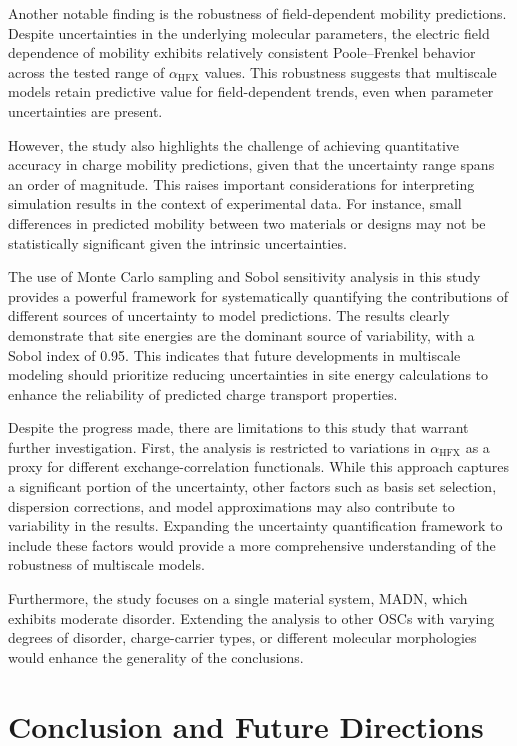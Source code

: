 \documentclass[%
 reprint,
superscriptaddress,
 amsmath,amssymb,
 aps,
prb,
floatfix
]{revtex4-2}
\newcommand{\ahfx}{\ensuremath{\alpha_\text{HFX}}\xspace}
\begin{document}
Another notable finding is the robustness of field-dependent mobility predictions. Despite uncertainties in the underlying molecular parameters, the electric field dependence of mobility exhibits relatively consistent Poole--Frenkel behavior across the tested range of \ahfx values. This robustness suggests that multiscale models retain predictive value for field-dependent trends, even when parameter uncertainties are present.  

However, the study also highlights the challenge of achieving quantitative accuracy in charge mobility predictions, given that the uncertainty range spans an order of magnitude. This raises important considerations for interpreting simulation results in the context of experimental data. For instance, small differences in predicted mobility between two materials or designs may not be statistically significant given the intrinsic uncertainties.  

The use of Monte Carlo sampling and Sobol sensitivity analysis in this study provides a powerful framework for systematically quantifying the contributions of different sources of uncertainty to model predictions. The results clearly demonstrate that site energies are the dominant source of variability, with a Sobol index of 0.95. This indicates that future developments in multiscale modeling should prioritize reducing uncertainties in site energy calculations to enhance the reliability of predicted charge transport properties.  

Despite the progress made, there are limitations to this study that warrant further investigation. First, the analysis is restricted to variations in \ahfx as a proxy for different exchange-correlation functionals. While this approach captures a significant portion of the uncertainty, other factors such as basis set selection, dispersion corrections, and model approximations may also contribute to variability in the results. Expanding the uncertainty quantification framework to include these factors would provide a more comprehensive understanding of the robustness of multiscale models.  

Furthermore, the study focuses on a single material system, MADN, which exhibits moderate disorder. Extending the analysis to other OSCs with varying degrees of disorder, charge-carrier types, or different molecular morphologies would enhance the generality of the conclusions.  

\section{Conclusion and Future Directions}
\end{document}
